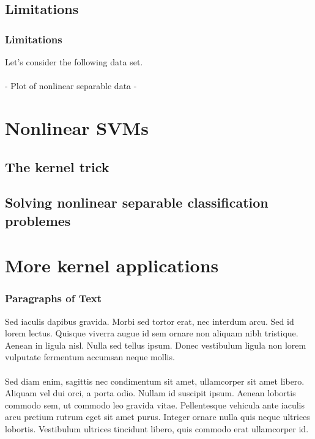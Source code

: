 \documentclass{beamer}
\begin{document}

\subsection{Limitations}

\begin{frame}{}
    \frametitle{Limitations}
    Let's consider the following data set. \\~\\ 
    - Plot of nonlinear separable data - 
\end{frame}



\section{Nonlinear SVMs}

\subsection{The kernel trick}
\subsection{Solving nonlinear separable classification problemes}




\section{More kernel applications}









\begin{frame}
\frametitle{Paragraphs of Text}
Sed iaculis dapibus gravida. Morbi sed tortor erat, nec interdum arcu. Sed id lorem lectus. Quisque viverra augue id sem ornare non aliquam nibh tristique. Aenean in ligula nisl. Nulla sed tellus ipsum. Donec vestibulum ligula non lorem vulputate fermentum accumsan neque mollis.\\~\\

Sed diam enim, sagittis nec condimentum sit amet, ullamcorper sit amet libero. Aliquam vel dui orci, a porta odio. Nullam id suscipit ipsum. Aenean lobortis commodo sem, ut commodo leo gravida vitae. Pellentesque vehicula ante iaculis arcu pretium rutrum eget sit amet purus. Integer ornare nulla quis neque ultrices lobortis. Vestibulum ultrices tincidunt libero, quis commodo erat ullamcorper id.
\end{frame}
\end{document}
